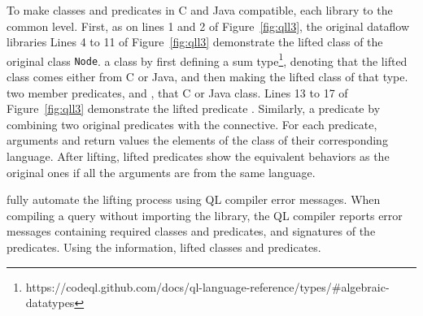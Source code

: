 To make classes and predicates in C and Java compatible,
 each library to the common level.
First, as on lines 1 and 2 of Figure~\ref{fig:qll3},  the
original dataflow libraries 
Lines 4 to 11 of Figure~\ref{fig:qll3} demonstrate the lifted class of the
original class {\tt Node}.
 a class by first defining a sum
type\footnote{https://codeql.github.com/docs/ql-language-reference/types/\#algebraic-datatypes},
denoting that the lifted class comes either from C or Java, and then making the
lifted class of that type.  
 two member predicates,  and
, that  C or Java class.
Lines 13 to 17 of Figure~\ref{fig:qll3} demonstrate the lifted predicate
.
Similarly,  a predicate by combining two original predicates with
the  connective. For each predicate, arguments and return values  the elements of the class of their corresponding language.
After lifting, lifted predicates show the equivalent behaviors as the original
ones if all the arguments are from the same language.

 fully automate the lifting process using QL compiler error
messages. When compiling a query without importing the library, the QL compiler
reports error messages containing required classes and predicates, and
signatures of the predicates. Using the information,  lifted classes and predicates.


